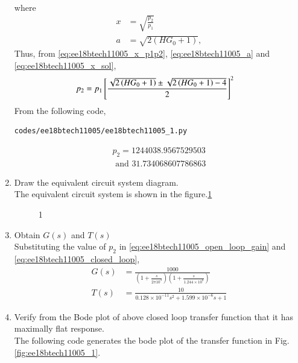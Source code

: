 \begin{enumerate}[label=\arabic*.,ref=\theenumi]
\begin{align}
\label{eq:ee18btech11005_x_sol}
\end{align}
%
where 
\begin{align}
\label{eq:ee18btech11005_x_p1p2}
x  &= \sqrt{\frac{p_2}{p_1}}
\\
a &= \sqrt{2(HG_0+1)}, 
\label{eq:ee18btech11005_a}
\end{align}
Thus, from \eqref{eq:ee18btech11005_x_p1p2}, \eqref{eq:ee18btech11005_a}
and \eqref{eq:ee18btech11005_x_sol},
%
\begin{align}
p_2 &= p_1{}\left[\frac{\sqrt{2\left(HG_0+1\right)} \pm \sqrt{2 \left(HG_0+1\right)-4}}{2}\right]^2
\end{align}
%
From the following code,
\begin{lstlisting}
codes/ee18btech11005/ee18btech11005_1.py
\end{lstlisting}
%
\begin{multline}
p_2 = 1244038.9567529503 
\\
\text{ and } 31.734068607786863
\end{multline}
%
\item  Draw the equivalent circuit system diagram.\\
\solution
The equivalent circuit system is shown in the figure.\ref{fig:equivalent_system}
\begin{figure}[!hbt]
	\begin{center}
			\resizebox{\columnwidth}{!}{}
	\end{center}
\caption{1}
\label{fig:equivalent_system}
\end{figure}
\item Obtain $G(s)$ and $T(s)$
\\
\solution Substituting the value of $p_2$ in  \eqref{eq:ee18btech11005_open_loop_gain} and \eqref{eq:ee18btech11005_closed_loop},
\begin{align}
     G(s) &= \frac{1000}{(1+\frac{s}{2\pi10^3})(1+\frac{s}{1.244\times10^6})}
    \label{eq:ee18btech11005_G(s)}
\\
    T(s) &= \frac{10}{0.128\times10^{-11}s^2+1.599\times10^{-6}s+1}
    \label{eq:ee18btech11005_Transfer_func}
\end{align}
\item Verify from the Bode plot of above closed loop transfer function that it has maximally flat response.
\\
\solution The following code generates the bode plot of the transfer function in Fig. \ref{fig:ee18btech11005_1}.

\end{enumerate}
